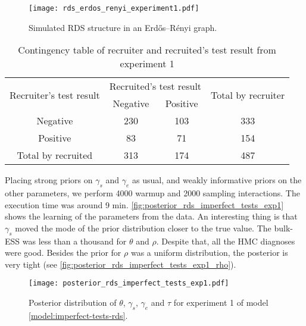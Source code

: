 \begin{figure}[htb]
  \centering
  \caption{\label{fig:rds_erdos_renyi_experiment1}Simulated RDS structure in
    an Erdős–Rényi graph.}
  \texttt{[image: rds\_erdos\_renyi\_experiment1.pdf]}
\end{figure}

\begin{table}[htb]
  \centering
  \caption{\label{tab:contingency-table-experiment1}Contingency table of
    recruiter and recruited's test result from experiment 1}
  \begin{tabular}{cccc}
    \hline
    \multirow{2}{*}{Recruiter's test result} & \multicolumn{2}{c}{Recruited's test result} & \multirow{2}{*}{Total by recruiter}       \\ \cline{2-3}
                                             & Negative                                    & Positive                            &     \\ \hline
    Negative                                 & 230                                         & 103                                 & 333 \\
    Positive                                 & 83                                          & 71                                  & 154 \\
    Total by recruited                       & 313                                         & 174                                 & 487 \\ \hline
  \end{tabular}
\end{table}

Placing strong priors on $\gamma_s$ and $\gamma_e$ as usual, and weakly
informative priors on the other parameters, we perform 4000 warmup and 2000
sampling interactions. The execution time was around 9 min.
\autoref{fig:posterior_rds_imperfect_tests_exp1} shows the learning of the
parameters from the data. An interesting thing is that $\gamma_s$ moved the
mode of the prior distribution closer to the true value. The bulk-ESS was less
than a thousand for $\theta$ and $\rho$. Despite that, all the HMC diagnoses were
good. Besides the prior for $\rho$ was a uniform distribution, the posterior
is very tight (see \autoref{fig:posterior_rds_imperfect_tests_exp1_rho}).

\begin{figure}
  \centering
  \caption{\label{fig:posterior_rds_imperfect_tests_exp1}Posterior distribution of
    $\theta$, $\gamma_s$, $\gamma_e$ and $\tau$ for experiment 1 of model
    \eqref{model:imperfect-tests-rds}.}
  \texttt{[image: posterior\_rds\_imperfect\_tests\_exp1.pdf]}
\end{figure}

